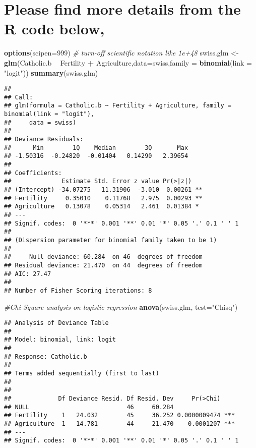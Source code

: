 \documentclass[]{article}
\newenvironment{Shaded}{\begin{snugshade}}{\end{snugshade}}
\newcommand{\CommentTok}[1]{\textcolor[rgb]{0.56,0.35,0.01}{\textit{#1}}}
\newcommand{\DataTypeTok}[1]{\textcolor[rgb]{0.13,0.29,0.53}{#1}}
\newcommand{\DecValTok}[1]{\textcolor[rgb]{0.00,0.00,0.81}{#1}}
\newcommand{\KeywordTok}[1]{\textcolor[rgb]{0.13,0.29,0.53}{\textbf{#1}}}
\newcommand{\NormalTok}[1]{#1}
\newcommand{\OperatorTok}[1]{\textcolor[rgb]{0.81,0.36,0.00}{\textbf{#1}}}
\newcommand{\StringTok}[1]{\textcolor[rgb]{0.31,0.60,0.02}{#1}}
\begin{document}
\hypertarget{please-find-more-details-from-the-r-code-below}{%
\section{Please find more details from the R code
below,}\label{please-find-more-details-from-the-r-code-below}}

\begin{Shaded}
\begin{Highlighting}[]
\KeywordTok{options}\NormalTok{(}\DataTypeTok{scipen=}\DecValTok{999}\NormalTok{)  }\CommentTok{# turn-off scientific notation like 1e+48}
\NormalTok{swiss.glm <-}\StringTok{ }\KeywordTok{glm}\NormalTok{(Catholic.b }\OperatorTok{~}\StringTok{ }\NormalTok{Fertility }\OperatorTok{+}\StringTok{ }\NormalTok{Agriculture,}\DataTypeTok{data=}\NormalTok{swiss,}\DataTypeTok{family =} \KeywordTok{binomial}\NormalTok{(}\DataTypeTok{link =} \StringTok{"logit"}\NormalTok{)) }
\KeywordTok{summary}\NormalTok{(swiss.glm)}
\end{Highlighting}
\end{Shaded}

\begin{verbatim}
## 
## Call:
## glm(formula = Catholic.b ~ Fertility + Agriculture, family = binomial(link = "logit"), 
##     data = swiss)
## 
## Deviance Residuals: 
##      Min        1Q    Median        3Q       Max  
## -1.50316  -0.24820  -0.01404   0.14290   2.39654  
## 
## Coefficients:
##              Estimate Std. Error z value Pr(>|z|)   
## (Intercept) -34.07275   11.31906  -3.010  0.00261 **
## Fertility     0.35010    0.11768   2.975  0.00293 **
## Agriculture   0.13078    0.05314   2.461  0.01384 * 
## ---
## Signif. codes:  0 '***' 0.001 '**' 0.01 '*' 0.05 '.' 0.1 ' ' 1
## 
## (Dispersion parameter for binomial family taken to be 1)
## 
##     Null deviance: 60.284  on 46  degrees of freedom
## Residual deviance: 21.470  on 44  degrees of freedom
## AIC: 27.47
## 
## Number of Fisher Scoring iterations: 8
\end{verbatim}

\begin{Shaded}
\begin{Highlighting}[]
\CommentTok{#Chi-Square analysis on logistic regression}
\KeywordTok{anova}\NormalTok{(swiss.glm, }\DataTypeTok{test=}\StringTok{"Chisq"}\NormalTok{)}
\end{Highlighting}
\end{Shaded}

\begin{verbatim}
## Analysis of Deviance Table
## 
## Model: binomial, link: logit
## 
## Response: Catholic.b
## 
## Terms added sequentially (first to last)
## 
## 
##             Df Deviance Resid. Df Resid. Dev     Pr(>Chi)    
## NULL                           46     60.284                 
## Fertility    1   24.032        45     36.252 0.0000009474 ***
## Agriculture  1   14.781        44     21.470    0.0001207 ***
## ---
## Signif. codes:  0 '***' 0.001 '**' 0.01 '*' 0.05 '.' 0.1 ' ' 1
\end{verbatim}
\end{document}
